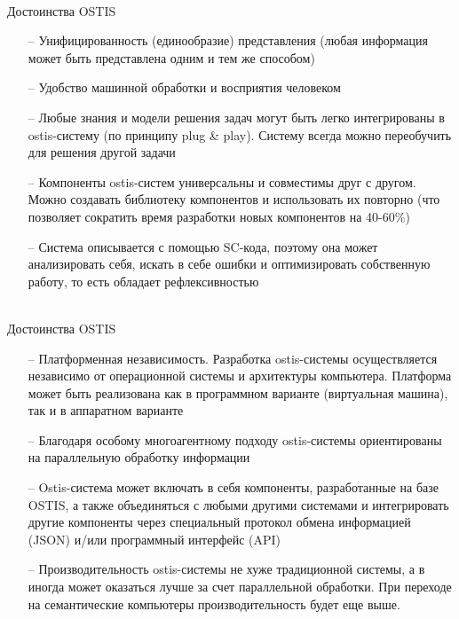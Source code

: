 \begin{frame}{\\Достоинства OSTIS}	
	\vspace{5mm}
	\begin{itemize}
		\item[--] Унифицированность (единообразие) представления (любая информация может быть представлена одним и тем же способом)
		\item[--] Удобство машинной обработки и восприятия человеком
		\item[--] Любые знания и модели решения задач могут быть легко интегрированы в ostis-систему (по принципу plug \& play). Систему всегда можно переобучить для решения другой задачи
		\item[--] Компоненты ostis-систем универсальны и совместимы друг с другом. Можно создавать библиотеку компонентов и использовать их повторно (что позволяет сократить время разработки новых компонентов на 40-60\%)
		\item[--] Система описывается с помощью SC-кода, поэтому она может анализировать себя, искать в себе ошибки и оптимизировать собственную работу, то есть обладает рефлексивностью
	\end{itemize}
\end{frame}

\begin{frame}{\\Достоинства OSTIS}
	\vspace{10mm}
	\begin{itemize}
		\item[--] Платформенная независимость. Разработка ostis-системы осуществляется независимо от операционной системы и архитектуры компьютера. Платформа может быть реализована как в программном варианте (виртуальная машина), так и в аппаратном варианте
		\item[--] Благодаря особому многоагентному подходу ostis-системы ориентированы на параллельную обработку информации
		\item[--] Ostis-система может включать в себя компоненты, разработанные на базе OSTIS, а также объединяться с любыми другими системами и интегрировать другие компоненты через специальный протокол обмена информацией (JSON) и/или программный интерфейс (API)
		\item[--] Производительность ostis-системы не хуже традиционной системы, а в иногда может оказаться лучше за счет параллельной обработки. При переходе на семантические компьютеры производительность будет еще выше.
	\end{itemize}
\end{frame}
  
